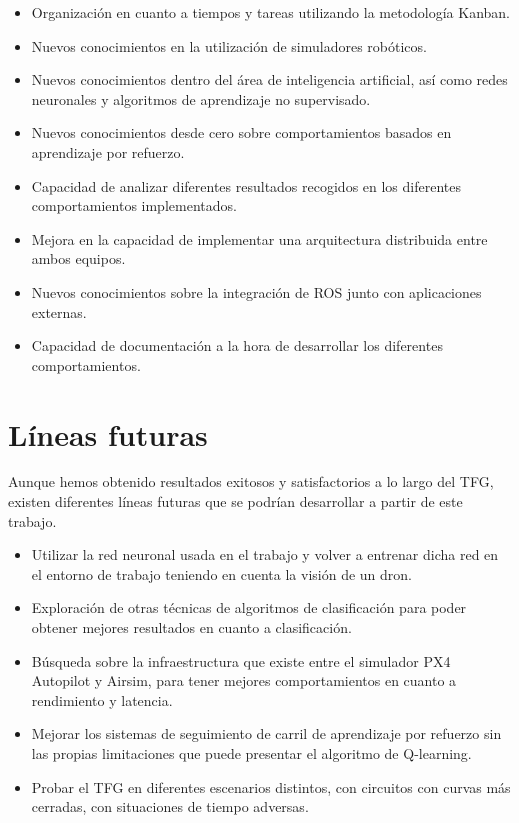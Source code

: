 \begin{itemize}
    \item Organización en cuanto a tiempos y tareas utilizando la metodología Kanban.
    \item Nuevos conocimientos en la utilización de simuladores robóticos.
    \item Nuevos conocimientos dentro del área de inteligencia artificial, así como redes neuronales y algoritmos de
    aprendizaje no supervisado. 
    \item Nuevos conocimientos desde cero sobre comportamientos basados en aprendizaje por refuerzo.
    \item Capacidad de analizar diferentes resultados recogidos en los diferentes comportamientos implementados.
    \item Mejora en la capacidad de implementar una arquitectura distribuida entre ambos equipos.
    \item Nuevos conocimientos sobre la integración de ROS junto con aplicaciones externas.
    \item Capacidad de documentación a la hora de desarrollar los diferentes comportamientos. 
\end{itemize}

\section{Líneas futuras}
\label{lineas_futuras}
Aunque hemos obtenido resultados exitosos y satisfactorios a lo largo del TFG, existen diferentes líneas futuras que se
podrían desarrollar a partir de este trabajo. \newline

\begin{itemize}
\item Utilizar la red neuronal usada en el trabajo y volver a entrenar dicha red en el entorno de trabajo teniendo en
cuenta la visión de un dron.
\item Exploración de otras técnicas de algoritmos de clasificación para poder obtener mejores resultados en cuanto a
clasificación.
\item Búsqueda sobre la infraestructura que existe entre el simulador PX4 Autopilot y Airsim, para tener mejores
comportamientos en cuanto a rendimiento y latencia.
\item Mejorar los sistemas de seguimiento de carril de aprendizaje por refuerzo sin las propias limitaciones que puede
presentar el algoritmo de Q-learning.
\item Probar el TFG en diferentes escenarios distintos, con circuitos con curvas más cerradas, con situaciones de tiempo
adversas. 
\end{itemize}